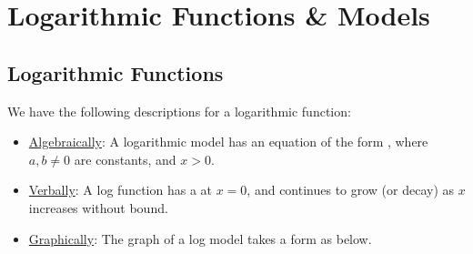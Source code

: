 \documentclass[notes]{subfiles}
\begin{document}
	\fancyhead[LO,RE]{\bfseries \currentname}
	\fancyfoot[C]{{}}
	\fancyfoot[RO,LE]{\large \thepage}	%

\section*{Logarithmic Functions \& Models}\label{cs18}
	\subsection*{Logarithmic Functions}
		We have the following descriptions for a logarithmic function:
		\begin{itemize}
			\item \underline{Algebraically}: A logarithmic model has an equation of the form , where $a,b\neq 0$ are constants, and $x > 0$.
			\item \underline{Verbally}: A log function has a  at $x = 0$, and continues to grow (or decay) as $x$ increases without bound.
			\item \underline{Graphically}: The graph of a log model takes a form as below.
		\end{itemize}
\end{document}
